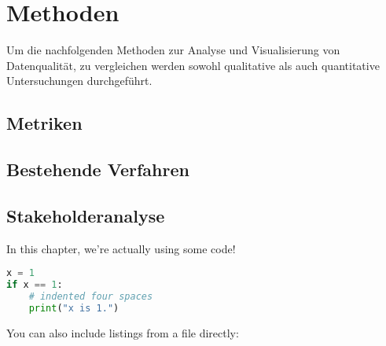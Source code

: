 \chapter{Methoden}\label{ch:method}
Um die nachfolgenden Methoden zur Analyse und Visualisierung von Datenqualität, zu vergleichen werden sowohl qualitative als auch quantitative Untersuchungen durchgeführt.


\section{Metriken}
\section{Bestehende Verfahren}
\section{Stakeholderanalyse}



In this chapter, we're actually using some code!

\begin{lstlisting}[language=Python,caption={This is an example of inline listing},captionpos=b]
x = 1
if x == 1:
    # indented four spaces
    print("x is 1.")

\end{lstlisting}

You can also include listings from a file directly:


